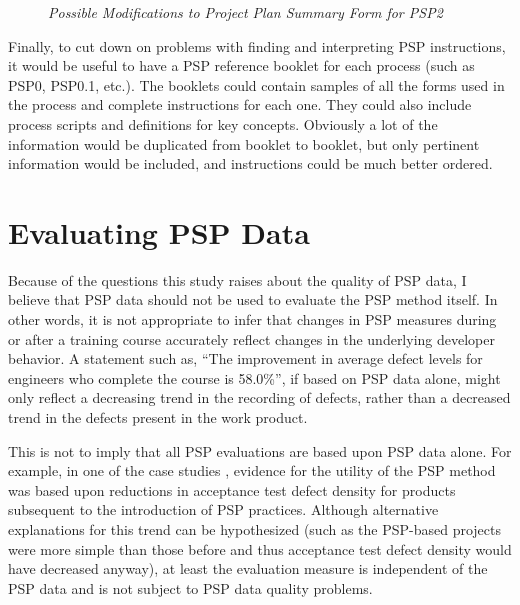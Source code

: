 \begin{figure}[p] 
  {\centerline{}}
    \caption[Possible Modifications to Project Plan Summary Form]{\label{fig:formChanged} 
      {\em Possible Modifications to Project Plan Summary Form for PSP2}}
\end{figure}


Finally, to cut down on problems with finding and interpreting PSP
instructions, it would be useful to have a PSP reference booklet for each
process (such as PSP0, PSP0.1, etc.).  The booklets could contain samples
of all the forms used in the process and complete instructions for each
one. They could also include process scripts and definitions for key
concepts. Obviously a lot of the information would be duplicated from
booklet to booklet, but only pertinent information would be included, and
instructions could be much better ordered.


\section{Evaluating PSP Data}

Because of the questions this study raises about the quality of PSP data, I
believe that PSP data should not be used to evaluate the PSP method itself.
In other words, it is not appropriate to infer that changes in PSP measures
during or after a training course accurately reflect changes in the
underlying developer behavior.  A statement such as, ``The improvement in
average defect levels for engineers who complete the course is 58.0\%'', if
based on PSP data alone, might only reflect a decreasing trend in the
recording of defects, rather than a decreased trend in the defects present
in the work product.

\newpage
This is not to imply that all PSP evaluations are based upon PSP data
alone.  For example, in one of the case studies \cite{Ferguson97}, evidence
for the utility of the PSP method was based upon reductions in acceptance
test defect density for products subsequent to the introduction of PSP
practices.  Although alternative explanations for this trend can be
hypothesized (such as the PSP-based projects were more simple than those
before and thus acceptance test defect density would have decreased
anyway), at least the evaluation measure is independent of the PSP data
and is not subject to PSP data quality problems.

